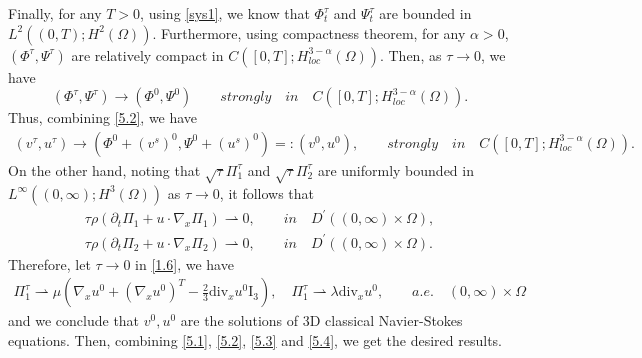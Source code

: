 \documentclass[10pt,reqno]{amsart}
\numberwithin{equation}{section}
\newcommand{\ddiv}{\mathrm{div}}
\begin{document}
Finally, for any $T>0$, using \eqref{sys1}, we know that $\Phi_t^{\tau}$ and $\Psi_t^{\tau}$ are bounded in $L^2((0,T);H^2(\Omega))$. Furthermore, using compactness theorem, for any $\alpha>0$, $(\Phi^{\tau},\Psi^{\tau})$ are relatively compact in $C([0,T];H_{loc}^{3-\alpha}(\Omega))$. Then, as $\tau\rightarrow0$, we have
\[
(\Phi^{\tau},\Psi^{\tau})\rightarrow(\Phi^0, \Psi^0)\qquad strongly\quad in \quad C([0,T];H_{loc}^{3-\alpha}(\Omega)).
\]
Thus, combining \eqref{5.2}, we have
\begin{align}\label{5.3}
(v^{\tau},u^{\tau})\rightarrow(\Phi^0+ (v^s)^{0}, \Psi^0+ (u^s)^{0})
=:(v^0, u^0),
\qquad strongly\quad in \quad C([0,T];H_{loc}^{3-\alpha}(\Omega)).
\end{align}
On the other hand, noting that $\sqrt{\tau}\Pi_1^{\tau}$ and $\sqrt{\tau}\Pi_2^{\tau}$ are uniformly bounded in $L^{\infty}((0,\infty);H^3(\Omega))$ as $\tau\rightarrow0$, it follows that
\[
 \begin{aligned}
\tau \rho \left(\partial_t\Pi_1+ u\cdot\nabla_x \Pi_1\right)\rightharpoonup 0,\qquad in \quad D^{\prime}((0,\infty)\times \Omega),\\
 \tau \rho \left(\partial_t\Pi_2+ u\cdot\nabla_x \Pi_2\right)\rightharpoonup 0,\qquad in \quad D^{\prime}((0,\infty)\times \Omega).
 \end{aligned}
 \]
Therefore, let $\tau\rightarrow0$ in \eqref{1.6}, we have
\begin{align}\label{5.4}
\Pi_1^{\tau}\rightharpoonup\mu\left(\nabla_xu^0+(\nabla_xu^0)^T-\frac{2}{3}\ddiv_x u^0\mathrm{I}_3\right),\quad
\Pi_1^{\tau}\rightharpoonup\lambda\ddiv_x u^0,
\qquad a.e. \quad (0,\infty)\times\Omega
\end{align}
and we conclude that $v^0,u^0$ are the solutions of 3D classical Navier-Stokes equations.
Then, combining \eqref{5.1}, \eqref{5.2}, \eqref{5.3} and \eqref{5.4}, we get the desired results.
\end{document}

